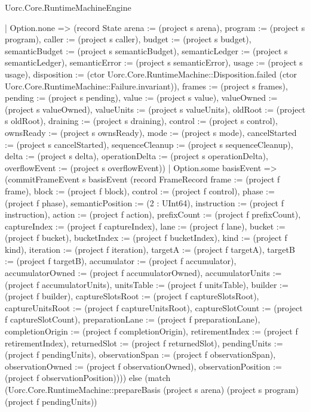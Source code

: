\begin{lexlean}{Uorc.Core.RuntimeMachineEngine}
\begin{semanticmodule}
{        | Option.none => (record State {arena := (project s arena), program := (project s program), caller := (project s caller), budget := (project s budget), semanticBudget := (project s semanticBudget), semanticLedger := (project s semanticLedger), semanticError := (project s semanticError), usage := (project s usage), disposition := (ctor Uorc.Core.RuntimeMachine::Disposition.failed (ctor Uorc.Core.RuntimeMachine::Failure.invariant)), frames := (project s frames), pending := (project s pending), value := (project s value), valueOwned := (project s valueOwned), valueUnits := (project s valueUnits), oldRoot := (project s oldRoot), draining := (project s draining), control := (project s control), ownsReady := (project s ownsReady), mode := (project s mode), cancelStarted := (project s cancelStarted), sequenceCleanup := (project s sequenceCleanup), delta := (project s delta), operationDelta := (project s operationDelta), overflowEvent := (project s overflowEvent)})
        | Option.some basisEvent => (commitFrameEvent s basisEvent (record FrameRecord {frame := (project f frame), block := (project f block), control := (project f control), phase := (project f phase), semanticPosition := (2 : UInt64), instruction := (project f instruction), action := (project f action), prefixCount := (project f prefixCount), captureIndex := (project f captureIndex), lane := (project f lane), bucket := (project f bucket), bucketIndex := (project f bucketIndex), kind := (project f kind), iteration := (project f iteration), targetA := (project f targetA), targetB := (project f targetB), accumulator := (project f accumulator), accumulatorOwned := (project f accumulatorOwned), accumulatorUnits := (project f accumulatorUnits), unitsTable := (project f unitsTable), builder := (project f builder), captureSlotsRoot := (project f captureSlotsRoot), captureUnitsRoot := (project f captureUnitsRoot), captureSlotCount := (project f captureSlotCount), preparationLane := (project f preparationLane), completionOrigin := (project f completionOrigin), retirementIndex := (project f retirementIndex), returnedSlot := (project f returnedSlot), pendingUnits := (project f pendingUnits), observationSpan := (project f observationSpan), observationOwned := (project f observationOwned), observationPosition := (project f observationPosition)}))) else (match (Uorc.Core.RuntimeMachine::prepareBasis (project s arena) (project s program) (project f pendingUnits))
}
\end{semanticmodule}
\end{lexlean}
